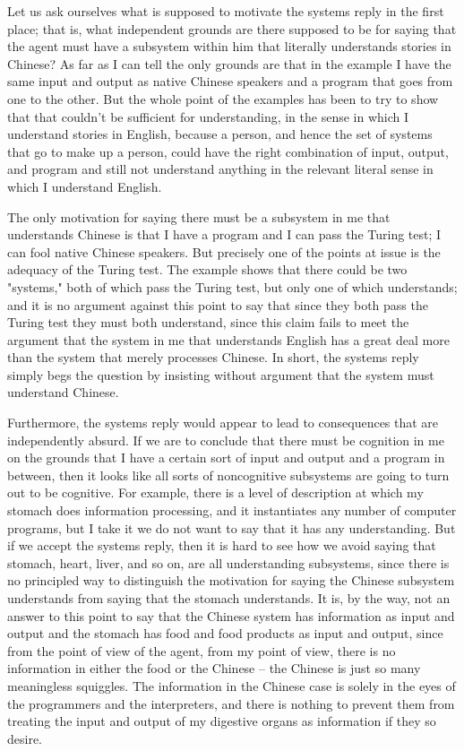 Let us ask ourselves what is supposed to motivate the systems reply in the first place; that is, what independent
grounds are there supposed to be for saying that the agent must have a subsystem within him that literally
understands stories in Chinese? As far as I can tell the only grounds are that in the example I have the same
input and output as native Chinese speakers and a program that goes from one to the other. But the whole
point of the examples has been to try to show that that couldn't be sufficient for understanding, in the sense in
which I understand stories in English, because a person, and hence the set of systems that go to make up a
person, could have the right combination of input, output, and program and still not understand anything in the
relevant literal sense in which I understand English.

The only motivation for saying there must be a subsystem in me that understands Chinese is that I have a
program and I can pass the Turing test; I can fool native Chinese speakers. But precisely one of the points at
issue is the adequacy of the Turing test. The example shows that there could be two "systems," both of which
pass the Turing test, but only one of which understands; and it is no argument against this point to say that since
they both pass the Turing test they must both understand, since this claim fails to meet the argument that the
system in me that understands English has a great deal more than the system that merely processes Chinese. In
short, the systems reply simply begs the question by insisting without argument that the system must understand
Chinese.

Furthermore, the systems reply would appear to lead to consequences that are independently absurd. If we are
to conclude that there must be cognition in me on the grounds that I have a certain sort of input and output and a
program in between, then it looks like all sorts of noncognitive subsystems are going to turn out to be cognitive.
For example, there is a level of description at which my stomach does information processing, and it instantiates
any number of computer programs, but I take it we do not want to say that it has any understanding\autocite{Pylyshyn1}. But if we accept the systems reply, then it is hard to
see how we avoid saying that stomach, heart, liver, and so on, are all understanding subsystems, since there is
no principled way to distinguish the motivation for saying the Chinese subsystem understands from saying that
the stomach understands. It is, by the way, not an answer to this point to say that the Chinese system has
information as input and output and the stomach has food and food products as input and output, since from the
point of view of the agent, from my point of view, there is no information in either the food or the Chinese -- the
Chinese is just so many meaningless squiggles. The information in the Chinese case is solely in the eyes of the
programmers and the interpreters, and there is nothing to prevent them from treating the input and output of my
digestive organs as information if they so desire.

